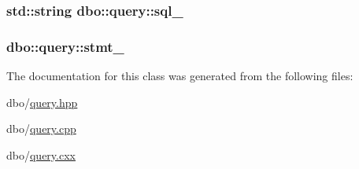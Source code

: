 \hypertarget{classdbo_1_1query_a387fe6e99acb27b15db7ed46979a0b51}{
\subsubsection[{sql\+\_\+}]{\setlength{\rightskip}{0pt plus 5cm}std\+::string dbo\+::query\+::sql\+\_\+\hspace{0.3cm}{\ttfamily [protected]}}}\label{classdbo_1_1query_a387fe6e99acb27b15db7ed46979a0b51}
\hypertarget{classdbo_1_1query_a7402009c90a36d6e941cff2408c89b4e}{
\subsubsection[{stmt\+\_\+}]{ dbo\+::query\+::stmt\+\_\+\hspace{0.3cm}{\ttfamily [protected]}}}\label{classdbo_1_1query_a7402009c90a36d6e941cff2408c89b4e}


The documentation for this class was generated from the following files\+:\begin{DoxyCompactItemize}
\item 
dbo/\hyperlink{query_8hpp}{query.\+hpp}\item 
dbo/\hyperlink{query_8cpp}{query.\+cpp}\item 
dbo/\hyperlink{query_8cxx}{query.\+cxx}\end{DoxyCompactItemize}
